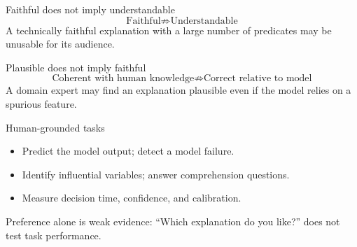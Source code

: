 \begin{frame}{Faithful does not imply understandable}
\[
\text{Faithful}\not\Rightarrow\text{Understandable}
\]
A technically faithful explanation with a large number of predicates may be unusable for its audience.
\end{frame}

\begin{frame}{Plausible does not imply faithful}
\[
\text{Coherent with human knowledge}\not\Rightarrow\text{Correct relative to model}
\]
A domain expert may find an explanation plausible even if the model relies on a spurious feature.
\end{frame}

\begin{frame}{Human-grounded tasks}
\begin{itemize}
  \item Predict the model output; detect a model failure.
  \item Identify influential variables; answer comprehension questions.
  \item Measure decision time, confidence, and calibration.
\end{itemize}
Preference alone is weak evidence: ``Which explanation do you like?'' does not test task performance.
\end{frame}
